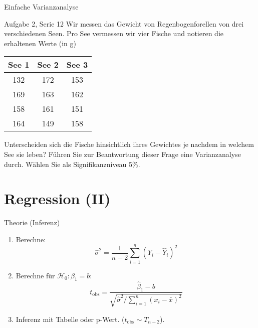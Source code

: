 \documentclass[handout]{beamer}
\begin{document}
\begin{frame}{Einfache Varianzanalyse}
\begin{beamerboxesrounded}[shadow]{Aufgabe 2, Serie 12}
Wir messen das Gewicht von Regenbogenforellen von drei verschiedenen Seen. Pro See
vermessen wir vier Fische und notieren die erhaltenen Werte (in g)

\vspace{2mm}\begin{center}{\scriptsize\begin{tabular}{ccc}\toprule
See 1 & See 2 & See 3\\\midrule
132 & 172 & 153\\
169 & 163 & 162\\
158 & 161 & 151\\
164 & 149 & 158\\
\bottomrule
\end{tabular}}\end{center}\vspace{2mm}

Unterscheiden sich die Fische hinsichtlich ihres Gewichtes je nachdem in welchem
See sie leben? Führen Sie zur Beantwortung dieser Frage eine Varianzanalyse durch.
Wählen Sie als Signifikanzniveau 5\%.
\end{beamerboxesrounded}
\end{frame}

\section{Regression (II)}

\begin{frame}{Theorie (Inferenz)}
\begin{enumerate}
\item Berechne:
$$
\hat{\sigma}^2 = \frac{1}{n-2}\sum_{i=1}^n (Y_i-\hat{Y}_i)^2
$$
\item Berechne für $\mathcal{H}_0: \beta_1=b$:
$$
t_\text{obs}=\frac{\hat\beta_1-b}{\sqrt{\hat\sigma^2/\sum_{i=1}^n(x_i-\bar{x})^2}}
$$
\item Inferenz mit Tabelle oder p-Wert. ($t_\text{obs}\sim T_{n-2}$).
\end{enumerate}
\end{frame}
\end{document}
